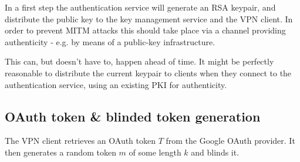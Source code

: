 \documentclass[a4paper]{scrreprt}
\newcommand{\var}[1]{\textit{#1}}
\begin{document}
In a first step the authentication service will generate an RSA keypair, and
distribute the public key to the key management service and the VPN client. In
order to prevent MITM attacks this should take place via a channel providing
authenticity - e.g. by means of a public-key infrastructure.

This can, but doesn't have to, happen ahead of time. It might be perfectly
reasonable to distribute the current keypair to clients when they connect to
the authentication service, using an existing PKI for authenticity.


\FloatBarrier

\subsection{OAuth token \& blinded token generation}

The VPN client retrieves an OAuth token $T$ from the Google OAuth provider. It
then generates a random token $m$ of some length $k$ and blinds it.


\FloatBarrier
\end{document}
